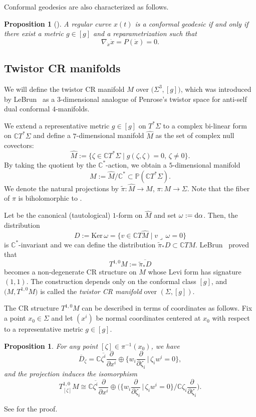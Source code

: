 \documentclass[pdftex]{sigma}
\newcommand\ol{\overline}
\numberwithin{equation}{section}
\newtheorem{Proposition}[Theorem]{Proposition}
 { \theoremstyle{definition}
\newtheorem{Definition}[Theorem]{Definition}
\newtheorem*{Notation}{Notation}
\newtheorem{Example}[Theorem]{Example}
\newtheorem{Remark}[Theorem]{Remark} }
\begin{document}
Conformal geodesics are also characterized as follows.

\begin{Proposition}[{\cite[Proposition 3.3]{BE}}]\label{conf-geod-characterization}
A regular curve $x(t)$ is a conformal geodesic if and only if there exist a metric $g\in[g]$ and a reparametrization such that
\[
\nabla_{\dot x}\dot x=P(\dot x)=0.
\]
\end{Proposition}

\subsection{Twistor CR manifolds}
We will define the twistor CR manifold $M$ over $\bigl(\Sigma^3, [g]\bigr)$, which was introduced by LeBrun~\cite{LeB} as a $3$-dimensional analogue of Penrose's twistor space for anti-self dual conformal $4$-manifolds.

We extend a representative metric $g\in[g]$ on $T^*\Sigma$ to a complex bi-linear form on $\mathbb{C}T^*\Sigma$ and define a $7$-dimensional manifold $\hat M$ as the set of complex null covectors:
\[
\hat M:=\{\zeta\in\mathbb{C}T^*\Sigma\mid g(\zeta, \zeta)=0,\, \zeta\neq0\}.
\]
By taking the quotient by the $\mathbb{C}^*$-action, we obtain a $5$-dimensional manifold
\[
M:=\hat M/\mathbb{C}^*\subset \mathbb{P}(\mathbb{C}T^*\Sigma).
\]
We denote the natural projections by $\tilde\pi\colon \hat M\to M$, $\pi\colon M\to \Sigma$. Note that the fiber of $\pi$ is biholomorphic to .

Let
 be the canonical (tautological) $1$-form on
$\hat M$ and set $\omega:={\rm d}\alpha$. Then, the distribution
\[
 D:=\textrm{Ker}\, \omega=\bigl\{v\in \mathbb{C}T\hat M\mid v\lrcorner\, \omega=0\bigr\}
\]
is $\mathbb{C}^*$-invariant and we can define the distribution $\tilde\pi_* D\subset \mathbb{C}TM$. LeBrun~\cite{LeB} proved that
\[
T^{1, 0}M:=\ol{\tilde\pi_* D}
\]
becomes a non-degenerate CR structure on $M$ whose Levi form has signature $(1, 1)$. The construction depends only on the conformal class $[g]$, and $\bigl(M, T^{1, 0}M\bigr)$ is called the {\it twistor CR manifold} over $(\Sigma, [g])$.

The CR structure $T^{1, 0}M$ can be described in terms of coordinates as follows.
Fix a point $x_0\in \Sigma$ and let $(x^i)$ be normal coordinates centered at $x_0$ with respect to a representative metric $g\in[g]$.
\begin{Proposition}\label{D}
For any point $[\zeta]\in \pi^{-1}(x_0)$, we have
\[
\ol D_{\zeta}=\mathbb{C}\ol{\zeta^i}\frac{\partial}{\partial x^i}\oplus \biggl\{ w_i\frac{\partial}{\partial \zeta_i} \, \bigg|\, \zeta_i w^i=0\biggr\},
\]
and the projection \smash{$\tilde\pi_*\colon \ol D_{\zeta}\to T^{1. 0}_{[\zeta]} M$} induces the isomorphism
\[
T^{1, 0}_{[\zeta]} M\cong\mathbb{C}\ol{\zeta^i}\frac{\partial}{\partial x^i}\oplus \biggl(\biggl\{ w_i\frac{\partial}{\partial \zeta_i}\, \bigg|\, \zeta_i w^i=0\biggr\}\Big/\mathbb{C}\zeta_i\frac{\partial}{\partial \zeta_i}\biggr).
\]
\end{Proposition}
See \cite[Proposition 6.1]{Mar} for the proof.
\end{document}
